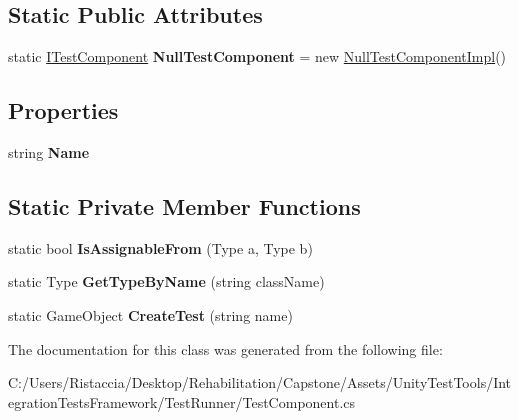 \subsection*{Static Public Attributes}
\begin{DoxyCompactItemize}
\item 
\mbox{\label{class_unity_test_1_1_test_component_abbeeb2f8305f5a3f88d0d141dc97749c}} 
static \hyperlink{interface_unity_test_1_1_i_test_component}{I\+Test\+Component} {\bfseries Null\+Test\+Component} = new \hyperlink{class_unity_test_1_1_test_component_1_1_null_test_component_impl}{Null\+Test\+Component\+Impl}()
\end{DoxyCompactItemize}
\subsection*{Properties}
\begin{DoxyCompactItemize}
\item 
\mbox{\label{class_unity_test_1_1_test_component_aba9a3f852cd40b39fccbf545a638ee01}} 
string {\bfseries Name}
\end{DoxyCompactItemize}
\subsection*{Static Private Member Functions}
\begin{DoxyCompactItemize}
\item 
\mbox{\label{class_unity_test_1_1_test_component_a9f4f83fdfd08ac1d8b1cb8ea5864f45d}} 
static bool {\bfseries Is\+Assignable\+From} (Type a, Type b)
\item 
\mbox{\label{class_unity_test_1_1_test_component_a58645a157a746e301070a8596459c6b7}} 
static Type {\bfseries Get\+Type\+By\+Name} (string class\+Name)
\item 
\mbox{\label{class_unity_test_1_1_test_component_a58d41de59edd6b0f9e4d696ef2b9c719}} 
static Game\+Object {\bfseries Create\+Test} (string name)
\end{DoxyCompactItemize}


The documentation for this class was generated from the following file\+:\begin{DoxyCompactItemize}
\item 
C\+:/\+Users/\+Ristaccia/\+Desktop/\+Rehabilitation/\+Capstone/\+Assets/\+Unity\+Test\+Tools/\+Integration\+Tests\+Framework/\+Test\+Runner/Test\+Component.\+cs\end{DoxyCompactItemize}
